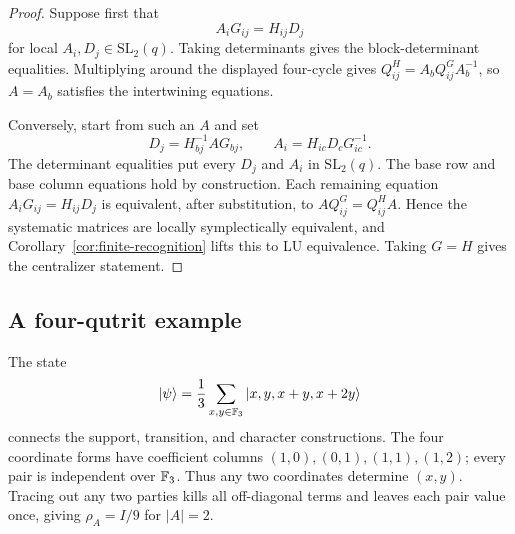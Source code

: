 \begin{proof}
Suppose first that
\[
 A_iG_{ij}=H_{ij}D_j
\]
for local \(A_i,D_j\in\mathrm{SL}_2(q)\).  Taking determinants gives the
block-determinant equalities.  Multiplying around the displayed four-cycle
gives \(Q^H_{ij}=A_bQ^G_{ij}A_b^{-1}\), so \(A=A_b\) satisfies the
intertwining equations.

Conversely, start from such an \(A\) and set
\[
 D_j=H_{bj}^{-1}AG_{bj},\qquad
 A_i=H_{ic}D_cG_{ic}^{-1}.
\]
The determinant equalities put every \(D_j\) and \(A_i\) in
\(\mathrm{SL}_2(q)\).  The base row and base column equations hold by
construction.  Each remaining equation \(A_iG_{ij}=H_{ij}D_j\) is
equivalent, after substitution, to
\(AQ^G_{ij}=Q^H_{ij}A\).  Hence the systematic matrices are locally
symplectically equivalent, and Corollary~\ref{cor:finite-recognition}
lifts this to LU equivalence.  Taking \(G=H\) gives the centralizer
statement.
\end{proof}



\subsection{A four-qutrit example}
\label{subsec:four-qutrit-example}

The state
\[
 |\psi\rangle=\frac13\sum_{x,y\in\mathbb F_3}|x,y,x+y,x+2y\rangle
\]
connects the support, transition, and character constructions.  The four
coordinate forms have coefficient columns
\((1,0),(0,1),(1,1),(1,2)\); every pair is independent over \(\mathbb F_3\).
Thus any two coordinates determine \((x,y)\).  Tracing out any two parties
kills all off-diagonal terms and leaves each pair value once, giving
\(\rho_A=I/9\) for \(|A|=2\).

